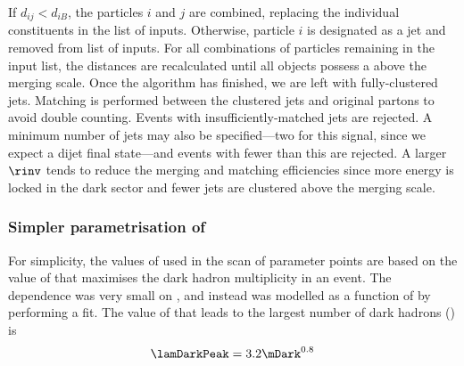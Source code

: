 If $d_{ij} < d_{iB}$, the particles $i$ and $j$ are combined, replacing the individual constituents in the list of inputs. Otherwise, particle $i$ is designated as a jet and removed from list of inputs. For all combinations of particles remaining in the input list, the distances are recalculated until all objects possess a \pt above the merging scale. Once the algorithm has finished, we are left with fully-clustered \glspl{jet}. Matching is performed between the clustered jets and original partons to avoid double counting. Events with insufficiently-matched jets are rejected. A minimum number of \glspl{jet} may also be specified---two for this signal, since we expect a dijet final state---and events with fewer than this are rejected. A larger $\rinv$ tends to reduce the merging and matching efficiencies since more energy is locked in the dark sector and fewer jets are clustered above the merging scale.





\subsubsection{Simpler parametrisation of \texorpdfstring{\aDark}{alpha\_dark}}
\label{subsubsec:svj_effective_alpha_dark}

For simplicity, the values of \aDark used in the scan of parameter points are based on the value of \lamDark that maximises the dark hadron multiplicity in an event. The dependence was very small on \mZprime, and instead was modelled as a function of \mDark by performing a fit. The value of \lamDark that leads to the largest number of dark hadrons (\lamDarkPeak) is
\begin{equation}
    \lamDarkPeak = 3.2 \mDark^{0.8}
    \label{eq:lambda_dark_peak_v_m_dark}
\end{equation}

